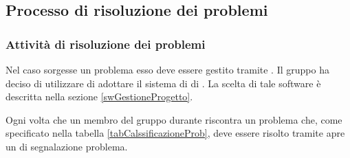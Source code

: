 \documentclass[12pt,a4paper]{article}
\begin{document}
\subsection{Processo di risoluzione dei problemi}

\subsubsection{Attività di risoluzione dei problemi} \label{gestioneDeiProblemi}
Nel caso sorgesse un problema esso deve essere gestito tramite . Il gruppo ha deciso di utilizzare  di adottare il sistema di  di . La scelta di tale software è descritta nella sezione \ref{swGestioneProgetto}.

Ogni volta che un membro del gruppo durante riscontra un problema che, come specificato nella tabella \ref{tabCalssificazioneProb}, deve essere risolto tramite  apre un  di segnalazione problema.
\end{document}
